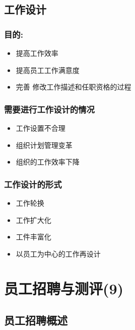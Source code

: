 \documentclass{ctexart}
\begin{document}
\subsection{工作设计}
\label{sec-1-4}
\subsubsection{目的:}
\label{sec-1-4-1}
\begin{itemize}
\item 提高工作效率
\item 提高员工工作满意度
\item 完善 修改工作描述和任职资格的过程
\end{itemize}
\subsubsection{需要进行工作设计的情况}
\label{sec-1-4-2}
\begin{itemize}
\item 工作设置不合理
\item 组织计划管理变革
\item 组织的工作效率下降
\end{itemize}
\subsubsection{工作设计的形式}
\label{sec-1-4-3}
\begin{itemize}
\item 工作轮换
\item 工作扩大化
\item 工件丰富化
\item 以员工为中心的工作再设计
\end{itemize}
\section{员工招聘与测评(9)}
\label{sec-2}
\subsection{员工招聘概述}
\label{sec-2-1}
\end{document}
